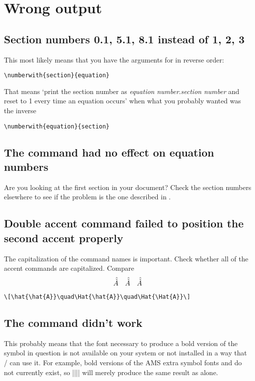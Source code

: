\documentclass[leqno,titlepage,openany]{amsldoc}
\begin{document}
\section{Wrong output}

\subsection{Section numbers 0.1, 5.1, 8.1 instead of 1, 2, 3}
\label{numinverse}

This most likely means that you have the arguments for 
in reverse order:
\begin{verbatim}
\numberwith{section}{equation}
\end{verbatim}
That means `print the section number as \textit{equation
number}.\textit{section number} and reset to 1 every time an equation
occurs' when what you probably wanted was the inverse
\begin{verbatim}
\numberwith{equation}{section}
\end{verbatim}

\subsection{The  command had no effect on equation
numbers}

Are you looking at the first section in your document? Check the section
numbers elsewhere to see if the problem is the one described in
.

\subsection{Double accent command failed to position the second accent
properly}

The capitalization of the command names is important. Check whether
all of the accent commands are capitalized. Compare
\[\hat{\hat{A}}\quad\Hat{\hat{A}}\quad\Hat{\Hat{A}}\]
\begin{verbatim}
\[\hat{\hat{A}}\quad\Hat{\hat{A}}\quad\Hat{\Hat{A}}\]
\end{verbatim}

\subsection{The  command didn't work}

This probably means that the font necessary to produce a bold version of
the symbol in question is not available on your system or not installed
in a way that \latex/ can use it. For example, bold versions of the
AMS extra symbol fonts  and  do not currently exist,
so |{||}| will merely produce the same result
as  alone.
\end{document}
